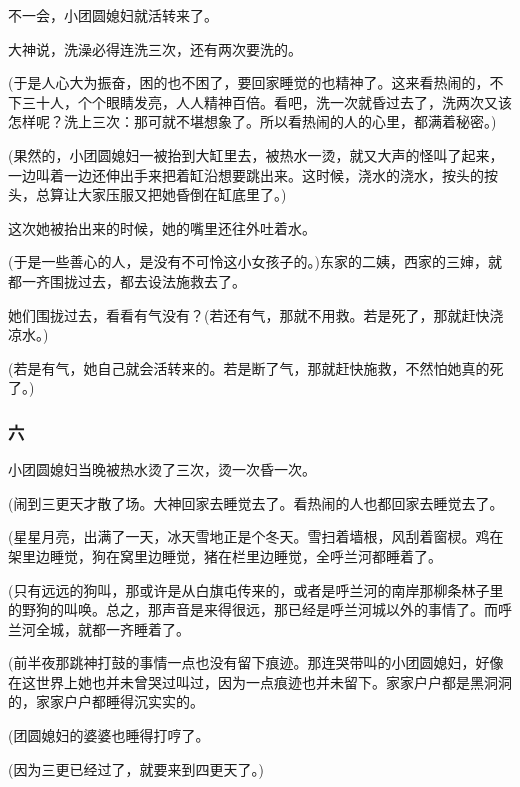 \par 不一会，小团圆媳妇就活转来了。
\par 大神说，洗澡必得连洗三次，还有两次要洗的。
\par (于是人心大为振奋，困的也不困了，要回家睡觉的也精神了。这来看热闹的，不下三十人，个个眼睛发亮，人人精神百倍。看吧，洗一次就昏过去了，洗两次又该怎样呢？洗上三次：那可就不堪想象了。所以看热闹的人的心里，都满着秘密。)
\par (果然的，小团圆媳妇一被抬到大缸里去，被热水一烫，就又大声的怪叫了起来，一边叫着一边还伸出手来把着缸沿想要跳出来。这时候，浇水的浇水，按头的按头，总算让大家压服又把她昏倒在缸底里了。)
\par 这次她被抬出来的时候，她的嘴里还往外吐着水。
\par (于是一些善心的人，是没有不可怜这小女孩子的。)东家的二姨，西家的三婶，就都一齐围拢过去，都去设法施救去了。
\par 她们围拢过去，看看有气没有？(若还有气，那就不用救。若是死了，那就赶快浇凉水。)
\par (若是有气，她自己就会活转来的。若是断了气，那就赶快施救，不然怕她真的死了。)
\subsubsection*{六}
\par 小团圆媳妇当晚被热水烫了三次，烫一次昏一次。
\par (闹到三更天才散了场。大神回家去睡觉去了。看热闹的人也都回家去睡觉去了。
\par (星星月亮，出满了一天，冰天雪地正是个冬天。雪扫着墙根，风刮着窗棂。鸡在架里边睡觉，狗在窝里边睡觉，猪在栏里边睡觉，全呼兰河都睡着了。
\par (只有远远的狗叫，那或许是从白旗屯传来的，或者是呼兰河的南岸那柳条林子里的野狗的叫唤。总之，那声音是来得很远，那已经是呼兰河城以外的事情了。而呼兰河全城，就都一齐睡着了。
\par (前半夜那跳神打鼓的事情一点也没有留下痕迹。那连哭带叫的小团圆媳妇，好像在这世界上她也并未曾哭过叫过，因为一点痕迹也并未留下。家家户户都是黑洞洞的，家家户户都睡得沉实实的。
\par (团圆媳妇的婆婆也睡得打哼了。
\par (因为三更已经过了，就要来到四更天了。)
